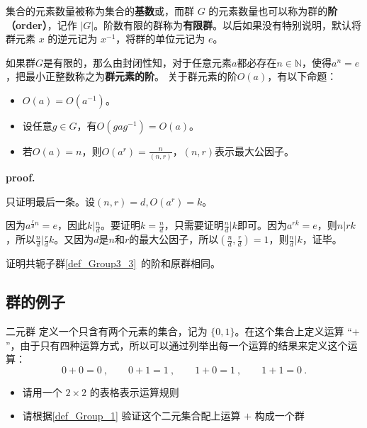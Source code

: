 集合的元素数量被称为集合的\textbf{基数}或，而群 $G$ 的元素数量也可以称为群的\textbf{阶（order）}，记作 $|G|$。阶数有限的群称为\textbf{有限群}。以后如果没有特别说明，默认将群元素 $x$ 的逆元记为 $x^{-1}$，将群的单位元记为 $e$。

如果群$G$是有限的，那么由封闭性知，对于任意元素$a$都必存在$n\in \mathbb N$，使得$a^n=e$，把最小正整数称之为\textbf{群元素的阶}。
关于群元素的阶$O(a)$，有以下命题：
\begin{theorem}{}
\begin{itemize}
\item $O(a)=O(a^{-1})$。
\item 设任意$g\in G$，有$O(gag^{-1})=O(a)$。
\item 若$O(a)=n$，则$O(a^r)=\frac{n}{(n,r)}$，$(n,r)$表示最大公因子。
\end{itemize}
\end{theorem}
\textbf{proof.}

只证明最后一条。设$(n,r)=d,O(a^r)=k$。

因为$a^{\frac{r}{d}n}=e$，因此$k|\frac{n}{d}$。要证明$k=\frac{n}{d}$，只需要证明$\frac{n}{d}|k$即可。因为$a^{rk}=e$，则$n|rk$，所以$\frac{n}{d}|\frac{r}{d}k$。又因为$d$是$n$和$r$的最大公因子，所以$(\frac{n}{d},\frac{r}{d})=1$，则$\frac{n}{d}|k$，证毕。
\begin{exercise}{}
证明共轭子群\autoref{def_Group3_3}~的阶和原群相同。
\end{exercise}
\subsection{群的例子}

\begin{exercise}{二元群}\label{exe_Group_1}
定义一个只含有两个元素的集合，记为 $\{0, 1\}$。在这个集合上定义运算 “$+$”，由于只有四种运算方式，所以可以通过列举出每一个运算的结果来定义这个运算：
\begin{equation}\label{eq_Group_1}
0+0=0~, \qquad 0+1=1~, \qquad 1+0=1~, \qquad 1+1=0~.
\end{equation}
\begin{itemize}
\item 请用一个 $2\times2$ 的表格表示运算规则
\item 请根据\autoref{def_Group_1} 验证这个二元集合配上运算 $+$ 构成一个群
\end{itemize}
\end{exercise}


